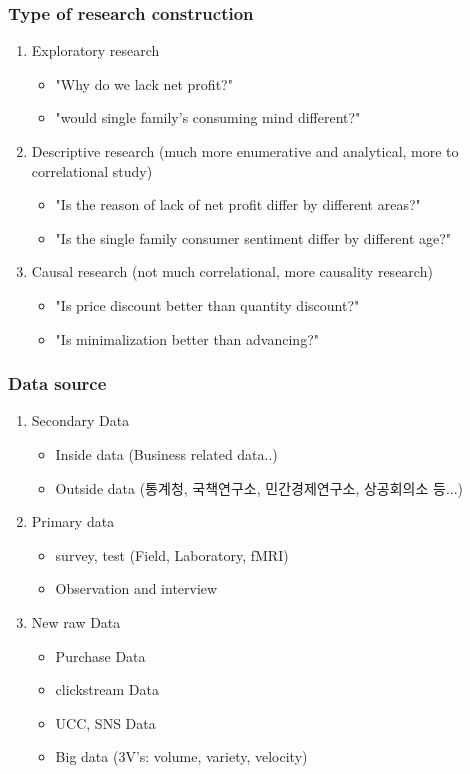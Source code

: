 \documentclass[12pt]{article}
\begin{document}
\subsubsection{Type of research construction}
\begin{enumerate}
	\item Exploratory research
	\begin{itemize}
		\item "Why do we lack net profit?"
		\item "would single family's consuming mind different?"
	\end{itemize}
	\item Descriptive research (much more enumerative and analytical, more to correlational study)
	\begin{itemize}
		\item "Is the reason of lack of net profit differ by different areas?"
		\item "Is the single family consumer sentiment differ by different age?"
	\end{itemize}
	\item Causal research (not much correlational, more causality research)
	\begin{itemize}
		\item "Is price discount better than quantity discount?"
		\item "Is minimalization better than advancing?"
	\end{itemize}

\end{enumerate}
\subsubsection{Data source}
\begin{enumerate}
	\item Secondary Data
	\begin{itemize}
		\item Inside data (Business related data..)
		\item Outside data (통계청, 국책연구소, 민간경제연구소, 상공회의소 등...)
	\end{itemize}
	\item Primary data
	\begin{itemize}
		\item survey, test (Field, Laboratory, fMRI)
		\item Observation and interview
	\end{itemize}
	\item New raw Data
	\begin{itemize}
		\item Purchase Data
		\item clickstream Data
		\item UCC, SNS Data
		\item Big data (3V's: volume, variety, velocity)
	\end{itemize}
\end{enumerate}
\end{document}
